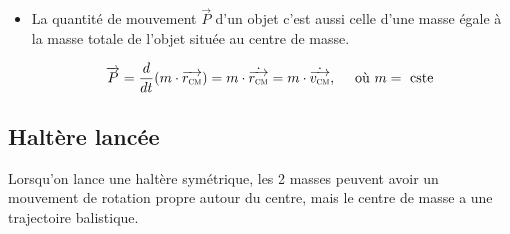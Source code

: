 \documentclass[
    11pt,
    a4paper,
    oneside,
    headinlcude, footinclude,
    twoside,
]{report}
\renewcommand{\vec}[1]{\overrightarrow{#1}}
\begin{document}
\begin{itemize}
    \item La quantité de mouvement $\vec P$ d'un objet c'est aussi celle d'une
        masse égale à la masse totale de l'objet située au centre de masse.

        \begin{equation}
            \vec P = \frac{d}{dt} (m \cdot \vec{r_{\textsc{cm}}}) = m \cdot
            \dot{\vec{r_{\textsc{cm}}}} = m \cdot \dot{\vec{v_{\textsc{cm}}}},
            \quad \text{ où } m = \text{ cste } 
        \end{equation}
\end{itemize}

\subsection{Haltère lancée}
\label{sub:haltere_lancee}

Lorsqu'on lance une haltère symétrique, les 2 masses peuvent avoir un
mouvement de rotation propre autour du centre, mais le centre de masse a une
trajectoire balistique.
\end{document}
